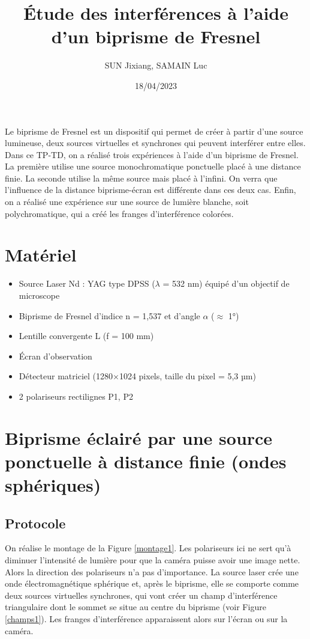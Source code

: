 \documentclass[11pt, a4paper]{article}
\title{Étude des interférences à l'aide d'un biprisme de Fresnel}
\author{SUN Jixiang, SAMAIN Luc}
\date{18/04/2023}
\begin{document}
\maketitle
\thispagestyle{fancy}

Le biprisme de Fresnel est un dispositif qui permet de créer à partir d'une source lumineuse, deux sources virtuelles et synchrones qui peuvent interférer entre elles. Dans ce TP-TD, on a réalisé trois expériences à l'aide d'un biprisme de Fresnel. La première utilise une source monochromatique ponctuelle placé à une distance finie. La seconde utilise la même source mais placé à l'infini. On verra que l'influence de la distance biprisme-écran est différente dans ces deux cas. Enfin, on a réalisé une expérience sur une source de lumière blanche, soit polychromatique, qui a créé les franges d'interférence colorées.

\section{Matériel}
\begin{itemize}
    \item Source Laser Nd : YAG type DPSS ($\lambda$ = 532 nm) équipé d'un objectif de microscope
    \item Biprisme de Fresnel d'indice n = 1,537 et d'angle $\alpha$ ($\approx$ 1°)
    \item Lentille convergente L (f = 100 mm)
    \item Écran d'observation
    \item Détecteur matriciel (1280$\times$1024 pixels, taille du pixel = 5,3 µm)
    \item 2 polariseurs rectilignes P1, P2
\end{itemize}


\section{Biprisme éclairé par une source ponctuelle à distance finie (ondes sphériques)}
\subsection{Protocole}
On réalise le montage de la Figure \ref{montage1}. Les polariseurs ici ne sert qu'à diminuer l'intensité de lumière pour que la caméra puisse avoir une image nette. Alors la direction des polariseurs n'a pas d'importance. La source laser crée une onde électromagnétique sphérique et, après le biprisme, elle se comporte comme deux sources virtuelles synchrones, qui vont créer un champ d'interférence triangulaire dont le sommet se situe au centre du biprisme (voir Figure \ref{champs1}). Les franges d'interférence apparaissent alors sur l'écran ou sur la caméra.
\end{document}
